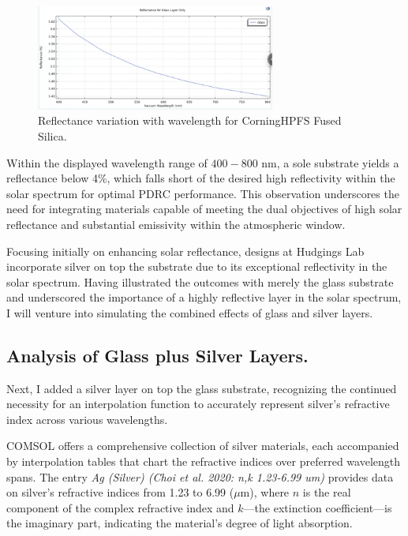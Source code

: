 \begin{figure}[H]
  \centering
  \includegraphics[width=0.7\textwidth]{Chapters/Figures/Chapter 4 Figures/Reflectance (Just Glass).png}
  \caption{Reflectance variation with wavelength for Corning\texttrademark \space HPFS\texttrademark {} Fused Silica.}
  \label{fig:Reflectance-variation-glass}
\end{figure}

Within the displayed wavelength range of $400 - 800$ nm, a sole substrate yields a reflectance below 4\%, which falls short of the desired high reflectivity within the solar spectrum for optimal PDRC performance. This observation underscores the need for integrating materials capable of meeting the dual objectives of high solar reflectance and substantial emissivity within the atmospheric window.

Focusing initially on enhancing solar reflectance, designs at Hudgings Lab incorporate silver on top the substrate due to its exceptional reflectivity in the solar spectrum. Having illustrated the outcomes with merely the glass substrate and underscored the importance of a highly reflective layer in the solar spectrum, I will venture into simulating the combined effects of glass and silver layers.

\subsection{Analysis of Glass plus Silver Layers.}
Next, I added a silver layer on top the glass substrate, recognizing the continued necessity for an interpolation function to accurately represent silver's refractive index across various wavelengths.

COMSOL offers a comprehensive collection of silver materials, each accompanied by interpolation tables that chart the refractive indices over preferred wavelength spans. The entry \emph{Ag (Silver) (Choi et al. 2020: n,k 1.23-6.99 um)} provides data on silver’s refractive indices from 1.23 to 6.99 ($\mu$m), where $n$ is the real component of the complex refractive index and $k$—the extinction coefficient—is the imaginary part, indicating the material's degree of light absorption.

